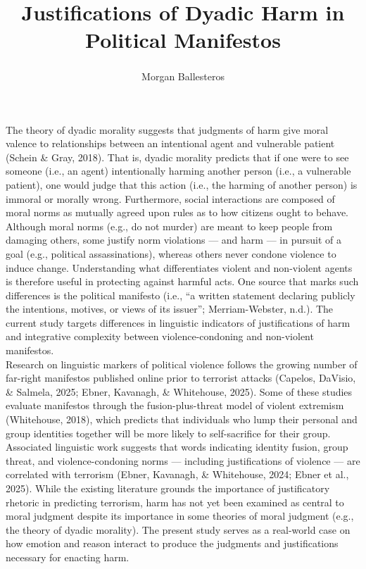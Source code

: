 \documentclass[
  english,
  man,floatsintext]{apa6}
\title{\textbf{Justifications of Dyadic Harm in Political Manifestos}}
\author{Morgan Ballesteros\textsuperscript{}}
\date{}
\affiliation{\vspace{0.5cm}\textsuperscript{} University of Chicago}
\begin{document}
\maketitle

The theory of dyadic morality suggests that judgments of harm give moral valence to
relationships between an intentional agent and vulnerable patient (Schein \& Gray, 2018).
That is, dyadic morality predicts that if one were to see someone (i.e., an agent) intentionally harming another person (i.e., a vulnerable patient), one would judge that this action (i.e., the harming of another person) is immoral or morally wrong. Furthermore, social interactions are composed of moral norms as mutually agreed upon rules as to how citizens ought to behave. Although moral norms (e.g., do not murder) are meant to keep people from damaging others, some justify norm violations --- and harm --- in pursuit of a goal (e.g., political assassinations), whereas others never condone violence to induce change. Understanding what differentiates violent and non-violent agents is therefore useful in protecting against harmful acts. One source that marks such differences is the political manifesto (i.e., ``a written statement declaring publicly the intentions, motives, or views of its issuer''; Merriam-Webster, n.d.). The current study targets differences in linguistic indicators of justifications of harm and integrative complexity between violence-condoning and non-violent manifestos.\\
Research on linguistic markers of political violence follows the growing number of far-right
manifestos published online prior to terrorist attacks (Capelos, DaVisio, \& Salmela, 2025; Ebner, Kavanagh, \& Whitehouse, 2025). Some of these studies evaluate manifestos through the fusion-plus-threat model of
violent extremism (Whitehouse, 2018), which predicts that individuals who lump their personal
and group identities together will be more likely to self-sacrifice for their group.
Associated linguistic work suggests that words indicating identity fusion, group threat, and
violence-condoning norms --- including justifications of violence --- are correlated with
terrorism (Ebner, Kavanagh, \& Whitehouse, 2024; Ebner et al., 2025). While the existing literature grounds the
importance of justificatory rhetoric in predicting terrorism, harm has not yet been examined
as central to moral judgment despite its importance in some theories of moral judgment (e.g.,
the theory of dyadic morality). The present study serves as a real-world case on how emotion
and reason interact to produce the judgments and justifications necessary for enacting harm.
\end{document}
